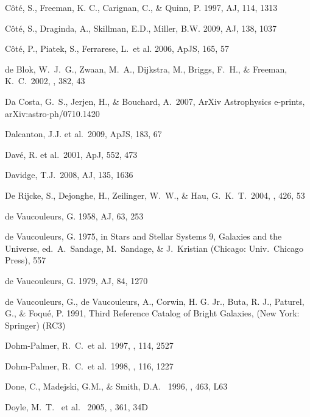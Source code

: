 \documentclass[12pt,preprint]{emulateapj}
\begin{document}
\begin{thebibliography}{}
C\^ot\'e, S., Freeman, K. C., Carignan, C., \& Quinn, P. 1997, AJ, 114, 1313

C\^ot\'e, S., Draginda, A., Skillman, E.D., Miller, B.W. 2009, AJ, 138, 1037

C\^ot\'e, P., Piatek, S., Ferrarese, L.~et al. 2006, ApJS, 165, 57

 de Blok, W.~J.~G., 
Zwaan, M.~A., Dijkstra, M., Briggs, F.~H., \& Freeman, K.~C.\ 2002, \aap, 
382, 43 

Da Costa, G.~S., Jerjen, H., \& Bouchard, A.\ 2007, ArXiv Astrophysics e-prints, arXiv:astro-ph/0710.1420

Dalcanton, J.J. et al.\ 2009, ApJS, 183, 67 

Dav\'e, R. et al.\ 2001, ApJ, 552, 473

Davidge, T.J.\ 2008, AJ, 135, 1636

De Rijcke, S., Dejonghe, H., Zeilinger, W.~W., \& Hau, G.~K.~T.\ 2004, \aap, 426, 53 

de Vaucouleurs, G. 1958, AJ, 63, 253

de Vaucouleurs, G. 1975, in Stars and Stellar Systems 9, Galaxies
and the Universe, ed.\ A.\ Sandage, M.\ Sandage, \& J.\ Kristian
(Chicago: Univ.\ Chicago Press), 557

de Vaucouleurs, G. 1979, AJ, 84, 1270

de Vaucouleurs, G., de Vaucouleurs, A., Corwin, H. G. Jr.,
Buta, R. J., Paturel, G., \& Foqu\'e, P. 1991, Third Reference
Catalog of Bright Galaxies, (New York: Springer) (RC3)

Dohm-Palmer, R.~C.~et al.\ 1997, \aj, 114, 2527 

Dohm-Palmer, R.~C.~et al.\ 1998, \aj, 116, 1227 

Done, C., Madejski, G.M., \& Smith, D.A. \ 1996, \apj, 463, L63 

Doyle, M.~T. ~et al. \ 2005, \mnras, 361, 34D 


\end{thebibliography}
\end{document}
